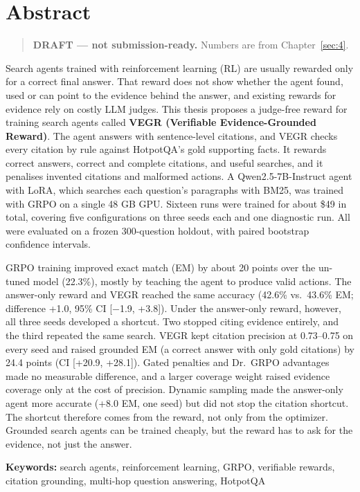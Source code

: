\section*{Abstract}\label{abstract}

\begin{quote}
\textbf{DRAFT --- not submission-ready.} Numbers are from
Chapter~\ref{sec:4}.
\end{quote}

Search agents trained with reinforcement learning (RL) are usually
rewarded only for a correct final answer. That reward does not show
whether the agent found, used or can point to the evidence behind the
answer, and existing rewards for evidence rely on costly LLM judges.
This thesis proposes a judge-free reward for training search agents
called \textbf{VEGR (Verifiable Evidence-Grounded Reward)}. The agent
answers with sentence-level citations, and VEGR checks every citation by
rule against HotpotQA's gold supporting facts. It rewards correct
answers, correct and complete citations, and useful searches, and it
penalises invented citations and malformed actions. A
Qwen2.5-7B-Instruct agent with LoRA, which searches each question's
paragraphs with BM25, was trained with GRPO on a single 48 GB GPU.
Sixteen runs were trained for about \$49 in total, covering five
configurations on three seeds each and one diagnostic run. All were
evaluated on a frozen 300-question holdout, with paired bootstrap
confidence intervals.

GRPO training improved exact match (EM) by about 20 points over the
un-tuned model (22.3\%), mostly by teaching the agent to produce valid
actions. The answer-only reward and VEGR reached the same accuracy
(42.6\% vs.~43.6\% EM; difference +1.0, 95\% CI {[}−1.9, +3.8{]}). Under
the answer-only reward, however, all three seeds developed a shortcut.
Two stopped citing evidence entirely, and the third repeated the same
search. VEGR kept citation precision at 0.73--0.75 on every seed and
raised grounded EM (a correct answer with only gold citations) by 24.4
points (CI {[}+20.9, +28.1{]}). Gated penalties and Dr.~GRPO advantages
made no measurable difference, and a larger coverage weight raised
evidence coverage only at the cost of precision. Dynamic sampling made
the answer-only agent more accurate (+8.0 EM, one seed) but did not stop
the citation shortcut. The shortcut therefore comes from the reward, not
only from the optimizer. Grounded search agents can be trained cheaply,
but the reward has to ask for the evidence, not just the answer.

\textbf{Keywords:} search agents, reinforcement learning, GRPO,
verifiable rewards, citation grounding, multi-hop question answering,
HotpotQA
